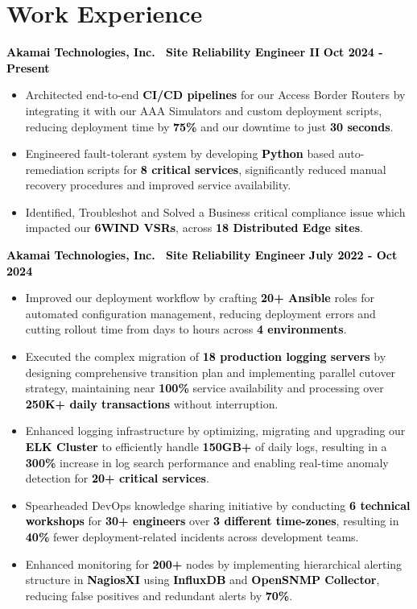 \documentclass[a4paper,10pt]{article}
\newcommand{\bb}[1]{\textcolor{black}{\textbf{#1}}}
\begin{document}
\section{Work Experience}
\bb{ Akamai Technologies, Inc. \textbar\ Site Reliability Engineer II } \hfill \bb{Oct 2024 - Present}
\begin{itemize}[nosep, leftmargin=2em, itemsep=3pt]
    \item Architected end-to-end \bb{CI/CD pipelines} for our Access Border Routers by integrating it with our AAA Simulators and custom deployment scripts, reducing deployment time by \bb{75\%} and our downtime to just \bb{30 seconds}.
    \item Engineered fault-tolerant system by developing \bb{Python} based auto-remediation scripts for \bb{8 critical services}, significantly reduced manual recovery procedures and improved service availability.
    \item Identified, Troubleshot and Solved a Business critical compliance issue which impacted our \bb{6WIND VSRs}, across \bb{18 Distributed Edge sites}.
\end{itemize}
\medskip
\bb{ Akamai Technologies, Inc. \textbar\ Site Reliability Engineer } \hfill \bb{July 2022 - Oct 2024}
\begin{itemize}[nosep, leftmargin=2em, itemsep=3pt]
    \item Improved our deployment workflow by crafting \bb{20+ Ansible} roles for automated configuration management, reducing deployment errors and cutting rollout time from days to hours across \bb{4 environments}.
    \item Executed the complex migration of \bb{18 production logging servers} by designing comprehensive transition plan and implementing parallel cutover strategy, maintaining near \bb{100\%} service availability and processing over \bb{250K+ daily transactions} without interruption.
    \item Enhanced logging infrastructure by optimizing, migrating and upgrading our \bb{ELK Cluster} to efficiently handle \bb{150GB+} of daily logs, resulting in a \bb{300\%} increase in log search performance and enabling real-time anomaly detection for \bb{20+ critical services}.
    \item Spearheaded DevOps knowledge sharing initiative by conducting \bb{6 technical workshops} for \bb{30+ engineers} over \bb{3 different time-zones}, resulting in \bb{40\%} fewer deployment-related incidents across development teams.
    \item Enhanced monitoring for \bb{200+} nodes by implementing hierarchical alerting structure in \bb{NagiosXI} using \bb{InfluxDB} and \bb{OpenSNMP Collector}, reducing false positives and redundant alerts by \bb{70\%}.
\end{itemize}
\vspace{-1em}
%
%
\end{document}
